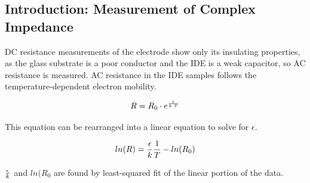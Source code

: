 \documentclass[12pt,oneside,english]{article}
\begin{document}
	\subsection{Introduction: Measurement of Complex Impedance} 
	DC resistance measurements of the electrode show only its insulating properties, as the glass substrate is a poor conductor and the IDE is a weak capacitor, so AC resistance is measured.
	AC resistance in the IDE samples follows the temperature-dependent electron mobility.
	
	\begin{equation}
		R = R_0 \cdot e^{\epsilon\over{k \cdot T}}
		\label{eq:emobility}
	\end{equation}
	
	This equation can be rearranged into a linear equation to solve for $\epsilon$.
	
	\begin{equation}
		ln(R) = {\epsilon\over{k}} {1\over{T}} - ln(R_0)
		\label{eq:solve_emobility}
	\end{equation}
	
	${\epsilon\over{k}}$ and $ln(R_0$ are found by least-squared fit of the linear portion of the data.
	
\end{document}
